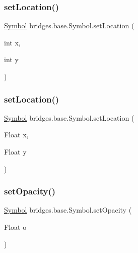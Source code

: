 \subsubsection{\texorpdfstring{set\+Location()}{setLocation()}\hspace{0.1cm}{\footnotesize\ttfamily [1/2]}}
{\footnotesize\ttfamily \mbox{\hyperlink{classbridges_1_1base_1_1_symbol}{Symbol}} bridges.\+base.\+Symbol.\+set\+Location (\begin{DoxyParamCaption}\item[{int}]{x,  }\item[{int}]{y }\end{DoxyParamCaption})}

\mbox{\label{classbridges_1_1base_1_1_symbol_a7d02e54c0cdfcaa7cb26176474207e39}} 
\subsubsection{\texorpdfstring{set\+Location()}{setLocation()}\hspace{0.1cm}{\footnotesize\ttfamily [2/2]}}
{\footnotesize\ttfamily \mbox{\hyperlink{classbridges_1_1base_1_1_symbol}{Symbol}} bridges.\+base.\+Symbol.\+set\+Location (\begin{DoxyParamCaption}\item[{Float}]{x,  }\item[{Float}]{y }\end{DoxyParamCaption})}

\mbox{\label{classbridges_1_1base_1_1_symbol_a1a0bf2838187440b3cf4b2a656eb3620}} 
\subsubsection{\texorpdfstring{set\+Opacity()}{setOpacity()}}
{\footnotesize\ttfamily \mbox{\hyperlink{classbridges_1_1base_1_1_symbol}{Symbol}} bridges.\+base.\+Symbol.\+set\+Opacity (\begin{DoxyParamCaption}\item[{Float}]{o }\end{DoxyParamCaption})}

